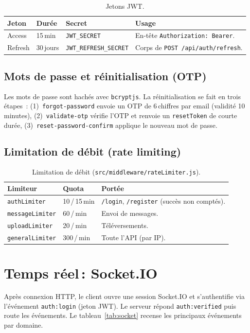 \documentclass[11pt,a4paper,oneside]{report}
\newcommand{\thd}[1]{\textbf{\textcolor{AlanyaIndigoDark}{#1}}}
\begin{document}
\begin{table}[H]
\centering
\begin{tabularx}{\linewidth}{@{}l l l X@{}}
\toprule
\thd{Jeton} & \thd{Dur\'{e}e} & \thd{Secret} & \thd{Usage}\\
\midrule
Access  & 15\,min   & \texttt{JWT\_SECRET}         & En-t\^{e}te \texttt{Authorization: Bearer}.\\
Refresh & 30\,jours & \texttt{JWT\_REFRESH\_SECRET} & Corps de \texttt{POST /api/auth/refresh}.\\
\bottomrule
\end{tabularx}
\caption{Jetons JWT.}
\end{table}

\subsection{Mots de passe et r\'{e}initialisation (OTP)}
Les mots de passe sont hach\'{e}s avec \texttt{bcryptjs}. La r\'{e}initialisation
se fait en trois \'{e}tapes~:
(1)~\texttt{forgot-password} envoie un OTP de 6\,chiffres par email (validit\'{e}
10\,minutes),
(2)~\texttt{validate-otp} v\'{e}rifie l'OTP et renvoie un \texttt{resetToken} de courte
dur\'{e}e,
(3)~\texttt{reset-password-confirm} applique le nouveau mot de passe.

\subsection{Limitation de d\'{e}bit (rate limiting)}
\begin{table}[H]
\centering
\begin{tabularx}{\linewidth}{@{}l l X@{}}
\toprule
\thd{Limiteur} & \thd{Quota} & \thd{Port\'{e}e}\\
\midrule
\texttt{authLimiter}    & 10\,/\,15\,min & \texttt{/login}, \texttt{/register} (succ\`{e}s non compt\'{e}s).\\
\texttt{messageLimiter} & 60\,/\,min     & Envoi de messages.\\
\texttt{uploadLimiter}  & 20\,/\,min     & T\'{e}l\'{e}versements.\\
\texttt{generalLimiter} & 300\,/\,min    & Toute l'API (par IP).\\
\bottomrule
\end{tabularx}
\caption{Limitation de d\'{e}bit (\texttt{src/middleware/rateLimiter.js}).}
\end{table}

\section{Temps r\'{e}el\,: Socket.IO}
Apr\`{e}s connexion HTTP, le client ouvre une session Socket.IO et s'authentifie
via l'\'{e}v\'{e}nement \texttt{auth:login} (jeton JWT). Le serveur r\'{e}pond
\texttt{auth:verified} puis route les \'{e}v\'{e}nements.
Le tableau~\ref{tab:socket} recense les principaux \'{e}v\'{e}nements par domaine.
\end{document}
